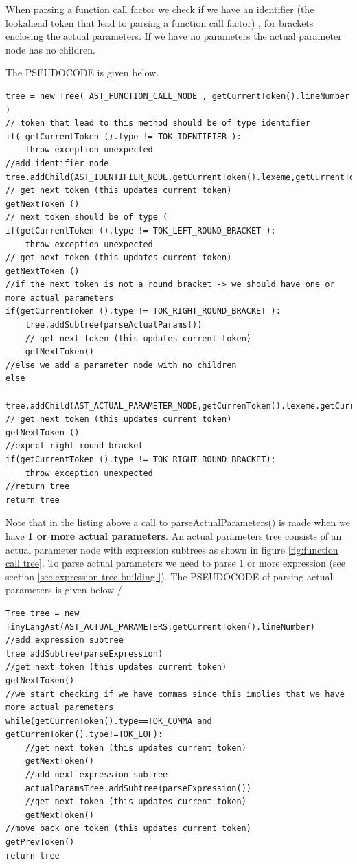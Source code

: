 When parsing a function call factor we check if we have an identifier (the lookahead token that lead to parsing a function call factor) , for brackets enclosing the actual parameters. If we have no parameters the actual parameter node has no children. 

The PSEUDOCODE  is given below.

\begin{lstlisting}[caption=PSEUDOCODE for building a function call expression tree]
tree = new Tree( AST_FUNCTION_CALL_NODE , getCurrentToken().lineNumber )
// token that lead to this method should be of type identifier
if( getCurrentToken ().type != TOK_IDENTIFIER ):
    throw exception unexpected
//add identifier node
tree.addChild(AST_IDENTIFIER_NODE,getCurrentToken().lexeme,getCurrentToken().lineNumber)
// get next token (this updates current token)
getNextToken ()
// next token should be of type (
if(getCurrentToken ().type != TOK_LEFT_ROUND_BRACKET ):
    throw exception unexpected
// get next token (this updates current token)
getNextToken ()
//if the next token is not a round bracket -> we should have one or more actual parameters
if(getCurrentToken ().type != TOK_RIGHT_ROUND_BRACKET ):
    tree.addSubtree(parseActualParams())
    // get next token (this updates current token)
    getNextToken()
//else we add a parameter node with no children
else
    tree.addChild(AST_ACTUAL_PARAMETER_NODE,getCurrenToken().lexeme.getCurrentToken().linenumber)
// get next token (this updates current token)
getNextToken ()
//expect right round bracket
if(getCurrentToken ().type != TOK_RIGHT_ROUND_BRACKET):
    throw exception unexpected
//return tree
return tree
\end{lstlisting}
Note that in the listing above a call to parseActualParameters() is made when we have \textbf{1 or more actual parameters}. An actual parameters tree consists of an actual parameter node with expression subtrees as shown in figure \ref{fig:function call tree}. To parse actual parameters we need to parse 1 or more expression (see section \ref{sec:expression tree building }). 
The PSEUDOCODE of parsing actual parameters is given below /
\begin{lstlisting}[caption=parsing 1 or more actual parameters (\emph{parseActualParams()})]
Tree tree = new TinyLangAst(AST_ACTUAL_PARAMETERS,getCurrentToken().lineNumber)
//add expression subtree
tree addSubtree(parseExpression)
//get next token (this updates current token)
getNextToken()
//we start checking if we have commas since this implies that we have more actual paremeters
while(getCurrenToken().type==TOK_COMMA and getCurrenToken().type!=TOK_EOF):
    //get next token (this updates current token)
    getNextToken()
    //add next expression subtree
    actualParamsTree.addSubtree(parseExpression())
    //get next token (this updates current token)
    getNextToken()
//move back one token (this updates current token)
getPrevToken()
return tree
\end{lstlisting}

